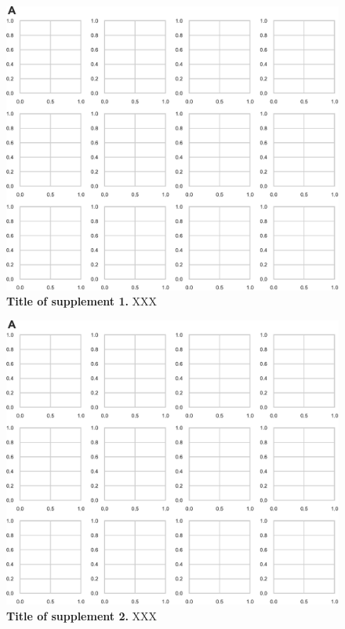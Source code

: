 \documentclass[11pt]{article}
\begin{document}
\begin{figure}
\hypertarget{fig:supp1}{%
\centering
\includegraphics{./figures/figureS1.pdf}
\caption{\textbf{Title of supplement 1.} XXX}\label{fig:supp1}
}
\end{figure}

\begin{figure}
\hypertarget{fig:supp2}{%
\centering
\includegraphics{./figures/figureS2.pdf}
\caption{\textbf{Title of supplement 2.} XXX}\label{fig:supp2}
}
\end{figure}
\end{document}
